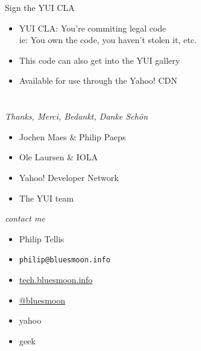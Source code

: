 \documentclass{beamer}
\begin{document}
\begin{frame}{Sign the YUI CLA}
  \begin{itemize}
  \item YUI CLA: You're commiting legal code \\ \footnotesize{ie: You own the code, you haven't stolen it, etc.}
  \item This code can also get into the YUI gallery
  \item Available for use through the Yahoo! CDN
  \end{itemize}
\end{frame}

\section{}
\begin{frame}{\textit{Thanks, Merci, Bedankt, Danke Sch\"on}}
  \begin{itemize}
  \item Jochen Maes \& Philip Paeps
  \item Ole Laursen \& IOLA
  \item Yahoo! Developer Network
  \item The YUI team
  \end{itemize}
\end{frame}

\begin{frame}{\textit{contact me}}
  \begin{itemize}
  \item Philip Tellis
  \item \small{\texttt{philip@bluesmoon.info}}
  \item \href{http://tech.bluesmoon.info/}{tech.bluesmoon.info}
  \item \href{http://twitter.com/bluesmoon}{@bluesmoon}
  \item yahoo
  \item geek
  \end{itemize}
\end{frame}
\end{document}
